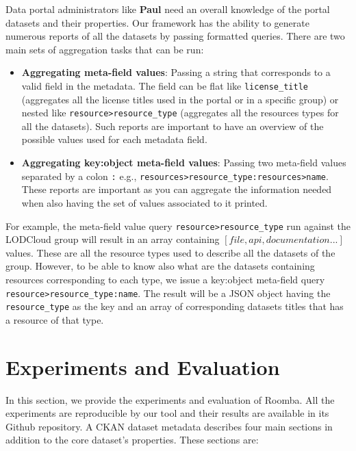 Data portal administrators like \textbf{Paul} need an overall knowledge of the portal datasets and their properties. Our framework has the ability to generate numerous reports of all the datasets by passing formatted queries. There are two main sets of aggregation tasks that can be run:
\begin{itemize}
  \item \textbf{Aggregating meta-field values}: Passing a string that corresponds to a valid field in the metadata. The field can be flat like \texttt{license\_title} (aggregates all the license titles used in the portal or in a specific group) or nested like \texttt{resource>resource\_type} (aggregates all the resources types for all the datasets). Such reports are important to have an overview of the possible values used for each metadata field.
  \item \textbf{Aggregating key:object meta-field values}: Passing two meta-field values separated by a colon \texttt{:} e.g., \texttt{resources>resource\_type:resources>name}. These reports are important as you can aggregate the information needed when also having the set of values associated to it printed.
\end{itemize}

For example, the meta-field value query \texttt{resource>resource\_type} run against the LODCloud group will result in an array containing $[file,api,documentation ...]$ values. These are all the resource types used to describe all the datasets of the group. However, to be able to know also what are the datasets containing resources corresponding to each type, we issue a key:object meta-field query\\ \texttt{resource>resource\_type:name}. The result will be a JSON object having the \texttt{resource\_type} as the key and an array of corresponding datasets titles that has a resource of that type.


\section{Experiments and Evaluation}
\label{section:roomba_experiment}

In this section, we provide the experiments and evaluation of Roomba. All the experiments are reproducible by our tool and their results are available in its Github repository. A CKAN dataset metadata describes four main sections in addition to the core dataset's properties. These sections are:

